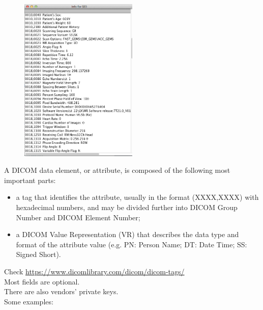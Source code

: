 \begin{figure}
	\includegraphics[width=0.5\textwidth]{figure_med/dicom_meta}
\end{figure} 


A DICOM data element, or attribute, is composed of the
following most important parts:
\begin{itemize}

\item a tag that identifies the attribute, usually in the format
(XXXX,XXXX) with hexadecimal numbers, and may be divided
further into DICOM Group Number and DICOM Element Number;
\item a DICOM Value Representation (VR) that describes the data type
and format of the attribute value (e.g. PN: Person Name; DT: Date
Time; SS: Signed Short).

\end{itemize}

Check \url{https://www.dicomlibrary.com/dicom/dicom-tags/}\\
Most fields are optional.\\
There are also vendors’ private keys.\\
Some examples:

